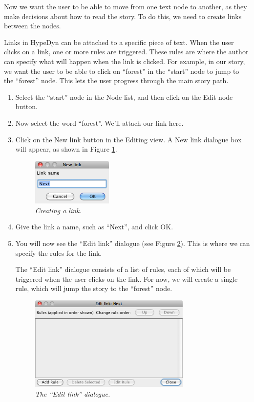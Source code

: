 \documentclass{article}
\begin{document}
Now we want the user to be able to move from one text node to another, as they
make decisions about how to read the story. To do this, we need to create links
between the nodes.

Links in HypeDyn can be attached to a specific piece of text. When the user
clicks on a link, one or more rules are triggered. These rules are where the
author can specify what will happen when the link is clicked. For example, in our
story, we want the user to be able to click on ``forest'' in the ``start'' node
to jump to the ``forest'' node. This lets the user progress through the main
story path.

\begin{enumerate}
  \item Select the ``start'' node in the Node list, and then click on the Edit
  node button.
  \item Now select the word ``forest''. We'll attach our link here.
  \item Click on the New link button in the Editing view. A New link dialogue
  box will appear, as shown in Figure \ref{fig:tut1:create_link}.

\begin{figure}[ht]
  \centering
  \includegraphics[width=4cm]{images/hypedyn-tutorial-1-figure-7}
  \caption{\textit{Creating a link.}}
  \label{fig:tut1:create_link}
\end{figure} 

\item Give the link a name, such as ``Next'', and click OK. \item You will now
see the ``Edit link'' dialogue (see Figure \ref{fig:tut1:edit_link_1}). This is where
we can specify the rules for the link.

The ``Edit link'' dialogue consists of a list of rules, each of which will be
triggered when the user clicks on the link. For now, we will create a single
rule, which will jump the story to the ``forest'' node.

\begin{figure}[ht]
  \centering
  \includegraphics[width=8cm]{images/hypedyn-tutorial-1-figure-8}
  \caption{\textit{The ``Edit link'' dialogue.}}
  \label{fig:tut1:edit_link_1}
\end{figure} 


\end{enumerate}
\end{document}
